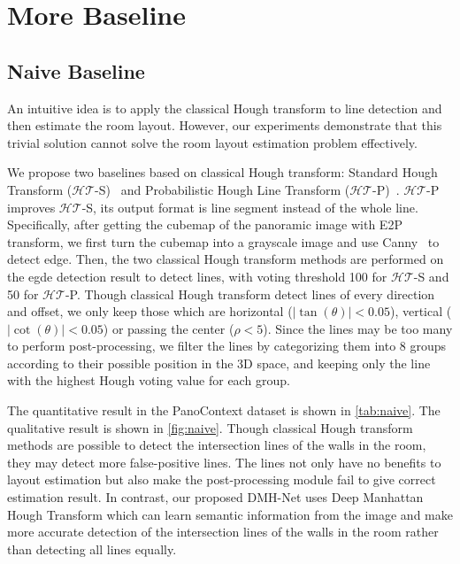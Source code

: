 \documentclass[runningheads]{llncs}
\begin{document}
\section{More Baseline}
\subsection{Naive Baseline}
An intuitive idea is to apply the classical Hough transform to line detection and then estimate the room layout. However, our experiments demonstrate that this trivial solution cannot solve the room layout estimation problem effectively.

We propose two baselines based on classical Hough transform: Standard Hough Transform ($\mathcal{HT}$-S)~\cite{hough1962method} and Probabilistic Hough Line Transform ($\mathcal{HT}$-P)~\cite{matas2000robust}. 
$\mathcal{HT}$-P improves $\mathcal{HT}$-S, its output format is line segment instead of the whole line.
Specifically, after getting the cubemap of the panoramic image with E2P transform, we first turn the cubemap into a grayscale image and use Canny~\cite{canny1986computational} to detect edge. Then, the two classical Hough transform methods are performed on the egde detection result to detect lines, with voting threshold 100 for $\mathcal{HT}$-S and 50 for $\mathcal{HT}$-P. Though classical Hough transform detect lines of every direction and offset, we only keep those which are horizontal ($|\tan(\theta)|<0.05$), vertical ($|\cot(\theta)|<0.05$) or passing the center ($\rho<5$). 
Since the lines may be too many to perform post-processing, we filter the lines by categorizing them into 8 groups according to their possible position in the 3D space, and keeping only the line with the highest Hough voting value for each group.

The quantitative result in the PanoContext dataset\cite{zhang2014panocontext} is shown in \cref{tab:naive}. The qualitative result is shown in \cref{fig:naive}. 
Though classical Hough transform methods are possible to detect the intersection lines of the walls in the room, they may detect more false-positive lines. The lines not only have no benefits to layout estimation but also make the post-processing module fail to give correct estimation result. In contrast, our proposed DMH-Net uses Deep Manhattan Hough Transform which can learn semantic information from the image and make more accurate detection of the intersection lines of the walls in the room rather than detecting all lines equally. 
\end{document}
